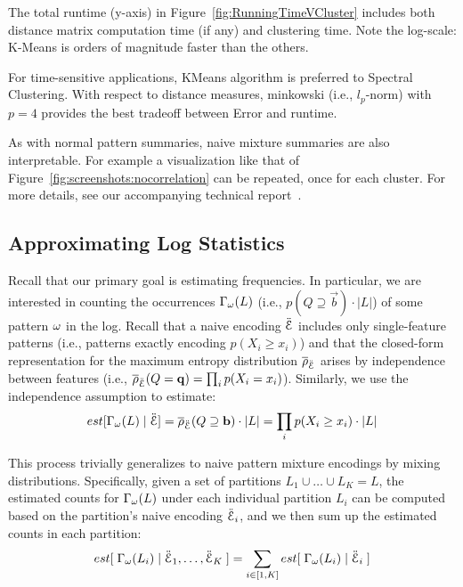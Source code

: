The total runtime (y-axis) in Figure~\ref{fig:RunningTimeVCluster} includes both distance matrix computation time (if any) and clustering time. 
Note the log-scale: K-Means is orders of magnitude faster than the others.

For time-sensitive applications, KMeans algorithm is preferred to Spectral Clustering.
With respect to distance measures, minkowski (i.e., $l_p$-norm) with $p=4$ provides the best tradeoff between Error and runtime.

As with normal pattern summaries, naive mixture summaries are also interpretable.
For example a visualization like that of Figure~\ref{fig:screenshots:nocorrelation} can be repeated, once for each cluster.  
For more details, see our accompanying technical report~\cite{DBLP:journals/corr/abs-1809-00405}.

\subsection{Approximating Log Statistics}
Recall that our primary goal is estimating frequencies.
In particular, we are interested in counting the occurrences $\Gamma_\omega(L)$ (i.e., $p(Q\supseteq\vec b)\cdot |L|$) of some pattern $\omega$ in the log.
Recall that a naive encoding $\ddot{\mathcal E}$ includes only single-feature patterns (i.e., patterns exactly encoding $p(X_i\ge x_i)$) and that the closed-form representation for the maximum entropy distribution $\overline \rho_{\ddot{\mathcal E}}$ arises by independence between features (i.e., $\overline \rho_{\ddot{\mathcal E}}(Q = \mathbf{q}) = \prod_{i} p(X_i = x_i)$).
Similarly, we use the independence assumption to estimate:
$$est[\Gamma_\omega(L)\;|\;\ddot{\mathcal E}]=\overline \rho_{\ddot{\mathcal E}}(Q \supseteq \mathbf{b})\cdot |L| = \prod_{i} p(X_i \geq x_i)\cdot |L|$$

This process trivially generalizes to naive pattern mixture encodings by mixing distributions.  
Specifically, given a set of partitions $L_1 \cup \ldots \cup L_K = L$, the estimated counts for $\Gamma_\omega(L)$ under each individual partition $L_i$ can be computed based on the partition's naive encoding $\ddot{\mathcal E}_i$, and we then sum up the estimated counts in each partition:
$$est[\;\Gamma_\omega(L_i)\;|\;\ddot{\mathcal E}_1, \ldots, \ddot{\mathcal E}_K\;] = \sum_{i \in [1, K]} est[\;\Gamma_\omega(L_i)\;|\;\ddot{\mathcal E}_i\;]$$

